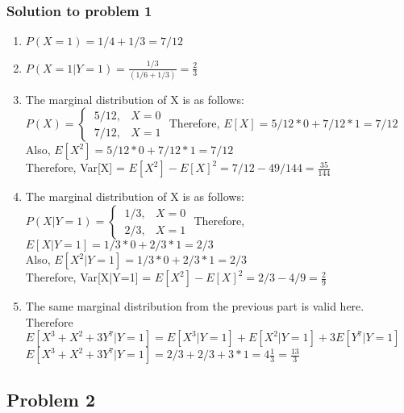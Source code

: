 \documentclass[12pt]{article}%
\begin{document}
\subsubsection{Solution to problem 1}

\begin{enumerate}
    \item $P(X=1) =  1/4 + 1/3 = 7/12$
    \item $P(X=1|Y=1) = \frac{1/3}{(1/6 + 1/3)} = \frac{2}{3}$
    \item The marginal distribution of X is as follows:\\
            $P(X)= 
            \begin{cases}
            \ 5/12 ,&  X = 0\\
            \ 7/12,              & X = 1
            \end{cases}$
            \newline
            Therefore, $E[X] = 5/12 * 0 + 7/12 * 1 = 7/12$\\
            Also, $E[X^2] = 5/12 * 0 + 7/12 * 1 = 7/12$\\
            Therefore, Var[X] = $E[X^2] - E[X]^2 = 7/12 - 49/144 = \frac{35}{144}$
            
    \item The marginal distribution of X is as follows:\\
            $P(X|Y=1)= 
            \begin{cases}
            \ 1/3 ,&  X = 0\\
            \ 2/3 ,& X = 1
            \end{cases}$
            \newline
            Therefore, $E[X|Y=1] = 1/3 * 0 + 2/3 * 1 = 2/3$\\
            Also, $E[X^2|Y=1] = 1/3 * 0 + 2/3 * 1 = 2/3$\\
            Therefore, Var[X|Y=1] = $E[X^2] - E[X]^2 = 2/3 - 4/9 = \frac{2}{9}$
    \item The same marginal distribution from the previous part is valid here. Therefore\\
    $E[X^3 + X^2 + 3Y^7|Y = 1] = E[X^3|Y=1] + E[X^2|Y=1] + 3E[Y^7|Y=1]$\\
    $E[X^3 + X^2 + 3Y^7|Y = 1] = 2/3 + 2/3 + 3*1 = 4\frac{1}{3} = \frac{13}{3}$
\end{enumerate}


\subsection{Problem 2}
\end{document}
